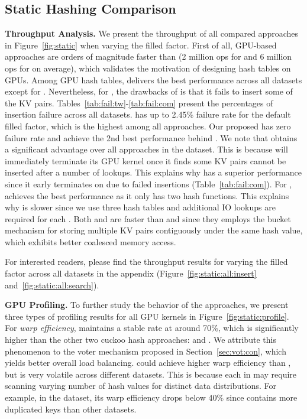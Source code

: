 \subsection{Static Hashing Comparison}\label{sec:exp:static}

\vspace{1mm}\noindent\textbf{Throughput Analysis.} We present the throughput of all compared approaches in Figure~\ref{fig:static} when varying the filled factor. 
First of all, GPU-based approaches are orders of magnitude faster than \google (2  million ops for  and 6 million ops for  on average), which validates the motivation of designing hash tables on GPUs. 
Among GPU hash tables, \megakv delivers the best performance across all datasets except for \dsali. Nevertheless, for , the drawbacks of \megakv is that it fails to insert some of the KV pairs. Tables~\ref{tab:fail:tw}-\ref{tab:fail:com} present the percentages of insertion failure across all datasets. \megakv has up to 2.45\% failure rate for the default filled factor, which is the highest among all approaches. 
Our proposed \voter has zero failure rate and achieve the 2nd best performance behind \megakv. We note that \cudpp obtains a significant advantage over all approaches in the \dsali dataset. This is because \cudpp will immediately terminate its GPU kernel once it finds some KV pairs cannot be inserted after a number of lookups. This explains why \cudpp has a superior performance since it early terminates on \dsali due to failed insertions (Table~\ref{tab:fail:com}). For , \megakv achieves the best performance as it only has two hash functions. This explains why \voter is slower since we use three hash tables and additional IO lookups are required for each . Both \megakv and \voter are faster than \cudpp and \linear since they employs the bucket mechanism for storing multiple KV pairs contiguously under the same hash value, which exhibits better coalesced memory access.  

For interested readers, please find the throughput results for varying the filled factor across all datasets in the appendix (Figure~\ref{fig:static:all:insert} and~\ref{fig:static:all:search}). 


\vspace{1mm}\noindent\textbf{GPU Profiling.} To further study the behavior of the approaches, we present three types of profiling results for all  GPU kernels in Figure~\ref{fig:static:profile}.
For \emph{warp efficiency}, \voter maintains a stable rate at around 70\%, which is significantly higher than the other two cuckoo hash approaches: \megakv and \cudpp.  
We attribute this phenomenon to the voter mechanism proposed in Section~\ref{sec:vot:con}, which yields better overall load balancing. 
\linear could achieve higher warp efficiency than \voter, but is very volatile across different datasets. This is because each  in \linear may require scanning varying number of hash values for distinct data distributions. 
For example, in the \dsali dataset, its warp efficiency drops below 40\% since \dsali contains more duplicated keys than other datasets. 

